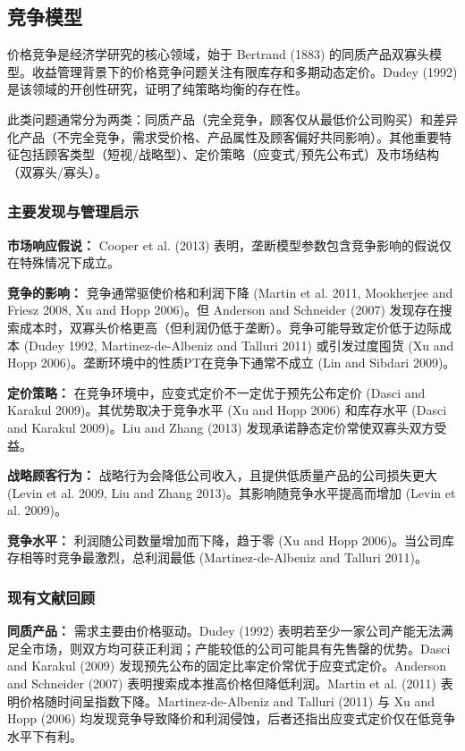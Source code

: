 \subsection{竞争模型}\label{models-with-competition}

价格竞争是经济学研究的核心领域，始于 Bertrand (1883) 的同质产品双寡头模型。收益管理背景下的价格竞争问题关注有限库存和多期动态定价。Dudey (1992) 是该领域的开创性研究，证明了纯策略均衡的存在性。

此类问题通常分为两类：同质产品（完全竞争，顾客仅从最低价公司购买）和差异化产品（不完全竞争，需求受价格、产品属性及顾客偏好共同影响）。其他重要特征包括顾客类型（短视/战略型）、定价策略（应变式/预先公布式）及市场结构（双寡头/寡头）。

\subsubsection{主要发现与管理启示}\label{main-findings-and-managerial-insights}

\textbf{市场响应假说：} Cooper et al. (2013) 表明，垄断模型参数包含竞争影响的假说仅在特殊情况下成立。

\textbf{竞争的影响：} 竞争通常驱使价格和利润下降 (Martin et al. 2011, Mookherjee and Friesz 2008, Xu and Hopp 2006)。但 Anderson and Schneider (2007) 发现存在搜索成本时，双寡头价格更高（但利润仍低于垄断）。竞争可能导致定价低于边际成本 (Dudey 1992, Martinez-de-Albeniz and Talluri 2011) 或引发过度囤货 (Xu and Hopp 2006)。垄断环境中的性质PT在竞争下通常不成立 (Lin and Sibdari 2009)。

\textbf{定价策略：} 在竞争环境中，应变式定价不一定优于预先公布定价 (Dasci and Karakul 2009)。其优势取决于竞争水平 (Xu and Hopp 2006) 和库存水平 (Dasci and Karakul 2009)。Liu and Zhang (2013) 发现承诺静态定价常使双寡头双方受益。

\textbf{战略顾客行为：} 战略行为会降低公司收入，且提供低质量产品的公司损失更大 (Levin et al. 2009, Liu and Zhang 2013)。其影响随竞争水平提高而增加 (Levin et al. 2009)。

\textbf{竞争水平：} 利润随公司数量增加而下降，趋于零 (Xu and Hopp 2006)。当公司库存相等时竞争最激烈，总利润最低 (Martinez-de-Albeniz and Talluri 2011)。

\subsubsection{现有文献回顾}\label{review-of-existing-literature}

\textbf{同质产品：}
需求主要由价格驱动。Dudey (1992) 表明若至少一家公司产能无法满足全市场，则双方均可获正利润；产能较低的公司可能具有先售罄的优势。Dasci and Karakul (2009) 发现预先公布的固定比率定价常优于应变式定价。Anderson and Schneider (2007) 表明搜索成本推高价格但降低利润。Martin et al. (2011) 表明价格随时间呈指数下降。Martinez-de-Albeniz and Talluri (2011) 与 Xu and Hopp (2006) 均发现竞争导致降价和利润侵蚀，后者还指出应变式定价仅在低竞争水平下有利。

